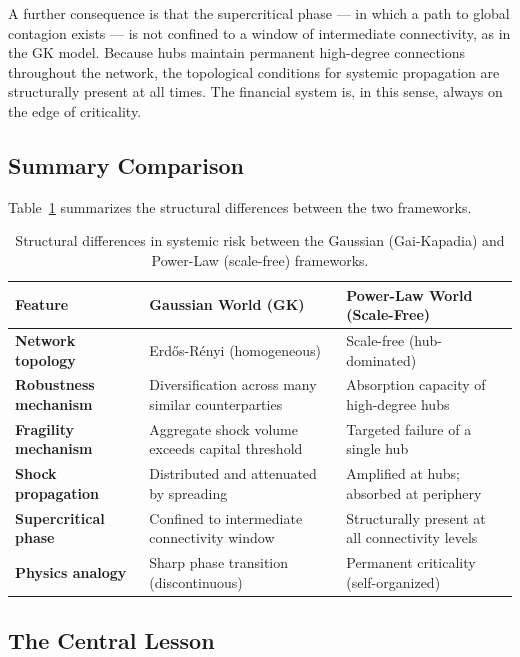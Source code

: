 \documentclass[a4paper,12pt,twoside]{article}
\begin{document}
A further consequence is that the supercritical phase — in which a 
path to global contagion exists — is not confined to a window of 
intermediate connectivity, as in the GK model. Because hubs maintain 
permanent high-degree connections throughout the network, the 
topological conditions for systemic propagation are structurally 
present at all times. The financial system is, in this sense, always 
on the edge of criticality.

\subsection{Summary Comparison}
\label{sec:summary_comparison}

Table~\ref{tab:comparison} summarizes the structural differences 
between the two frameworks.

\begin{table}[H]
\centering
\renewcommand{\arraystretch}{1.5}
\begin{tabular}{|l|p{5cm}|p{5cm}|}
\hline
\textbf{Feature} & \textbf{Gaussian World (GK)} & 
\textbf{Power-Law World (Scale-Free)} \\ \hline
\textbf{Network topology} & 
    Erdős-Rényi (homogeneous) & 
    Scale-free (hub-dominated) \\ \hline
\textbf{Robustness mechanism} & 
    Diversification across many similar counterparties & 
    Absorption capacity of high-degree hubs \\ \hline
\textbf{Fragility mechanism} & 
    Aggregate shock volume exceeds capital threshold & 
    Targeted failure of a single hub \\ \hline
\textbf{Shock propagation} & 
    Distributed and attenuated by spreading & 
    Amplified at hubs; absorbed at periphery \\ \hline
\textbf{Supercritical phase} & 
    Confined to intermediate connectivity window & 
    Structurally present at all connectivity levels \\ \hline
\textbf{Physics analogy} & 
    Sharp phase transition (discontinuous) & 
    Permanent criticality (self-organized) \\ \hline
\end{tabular}
\caption{Structural differences in systemic risk between the Gaussian 
(Gai-Kapadia) and Power-Law (scale-free) frameworks.}
\label{tab:comparison}
\end{table}
\newpage
\subsection{The Central Lesson}
\label{sec:takeaway}
\end{document}
